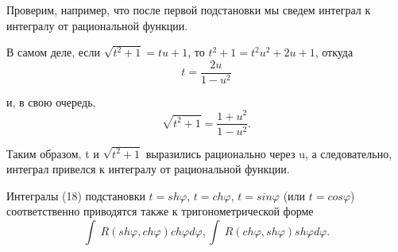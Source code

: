 \documentclass[10pt]{article}
\begin{document}
    \par Проверим, например, что после первой подстановки мы сведем интеграл к интегралу от рациональной функции.

    \par В самом деле, если $\sqrt{t^2 + 1} = tu + 1$, то $t^2 + 1 = t^2u^2 + 2u + 1$, откуда 
    $$t = \frac{2u}{1 - u^2}$$
    \par и, в свою очередь,
    $$\sqrt{t^2 + 1} = \frac{1 + u^2}{1 - u^2}.$$

    \par Таким образом, t и $\sqrt{t^2 + 1}$ выразились рационально через u, а следовательно, интеграл привелся к интегралу от рациональной функции.

    \par Интегралы (18) подстановки $t = sh\varphi$, $t = ch\varphi$, $t = sin\varphi$ (или $t = cos\varphi$) соответственно приводятся также к тригонометрической форме 
    $$\int \ R(sh\varphi, ch\varphi)ch\varphi d\varphi, \int \ R(ch\varphi, sh\varphi)sh\varphi d\varphi.$$
\end{document}
